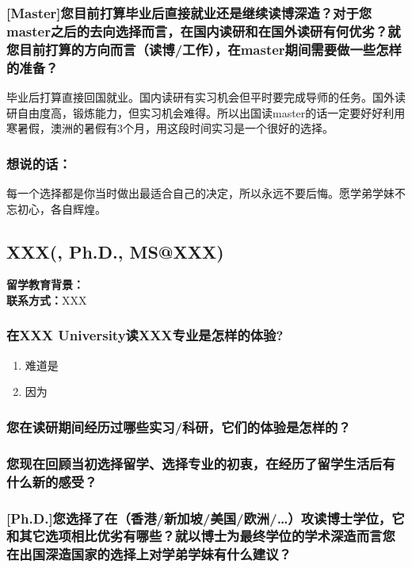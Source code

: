\documentclass[a4paper,UTF8]{book}
\begin{document}
    \subsubsection*{[Master]您目前打算毕业后直接就业还是继续读博深造？对于您master之后的去向选择而言，在国内读研和在国外读研有何优劣？就您目前打算的方向而言（读博/工作），在master期间需要做一些怎样的准备？}
    毕业后打算直接回国就业。国内读研有实习机会但平时要完成导师的任务。国外读研自由度高，锻炼能力，但实习机会难得。所以出国读master的话一定要好好利用寒暑假，澳洲的暑假有3个月，用这段时间实习是一个很好的选择。

    \subsubsection{想说的话：}
    每一个选择都是你当时做出最适合自己的决定，所以永远不要后悔。愿学弟学妹不忘初心，各自辉煌。






\clearpage
\subsection{XXX(, Ph.D., MS@XXX)}
    \textbf{留学教育背景：}\\
    \textbf{联系方式：}XXX

    \subsubsection*{在XXX University读XXX专业是怎样的体验?}
        \begin{enumerate}[itemindent=0pt,itemsep=0pt,parsep=0pt]
            \item 难道是
            \item 因为
        \end{enumerate}
    \subsubsection*{您在读研期间经历过哪些实习/科研，它们的体验是怎样的？}

    \subsubsection*{您现在回顾当初选择留学、选择专业的初衷，在经历了留学生活后有什么新的感受？}

    \subsubsection*{[Ph.D.]您选择了在（香港/新加坡/美国/欧洲/…）攻读博士学位，它和其它选项相比优劣有哪些？就以博士为最终学位的学术深造而言您在出国深造国家的选择上对学弟学妹有什么建议？}
\end{document}
